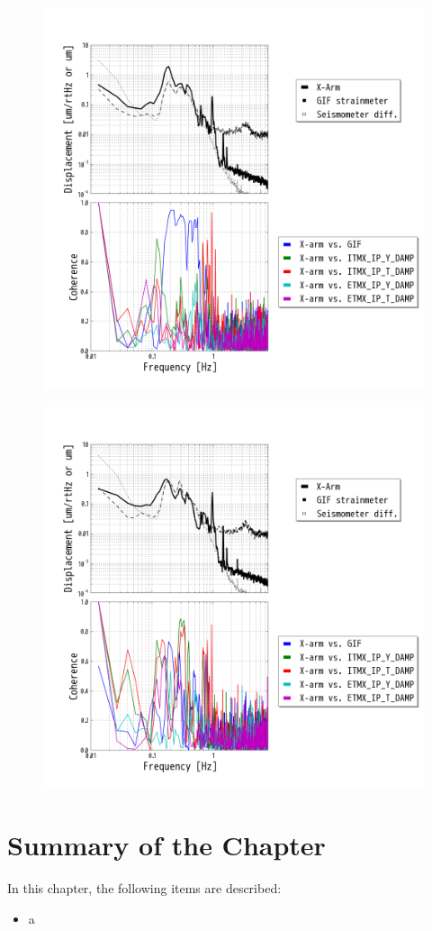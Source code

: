 \begin{figure}[p]
    \centering
    \includegraphics[width=15cm]{./img_chap6/img614.png}
    \caption{}\label{img:img614}
\end{figure}
\begin{figure}[p]
    \centering 
    \includegraphics[width=15cm]{./img_chap6/img615.png}
    \caption{}\label{img:img615}
\end{figure}



\section{Summary of the Chapter} \label{sec:sec53}
In this chapter, the following items are described:
\begin{itemize}
\item a
\end{itemize}


